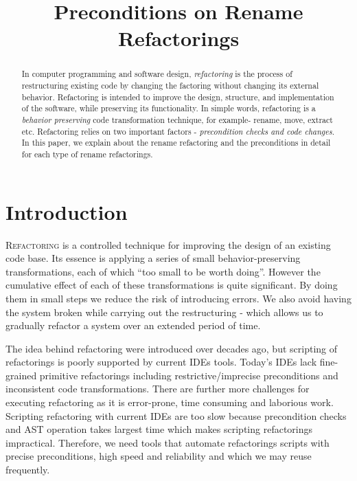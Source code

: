 \documentclass[10pt,conference]{IEEEtran}
\begin{document}
\title{Preconditions on Rename Refactorings}

\author{
\and
{}
\and
{}
}

\maketitle

\begin{abstract}
In computer programming and software design, \emph{refactoring} is the process of restructuring existing code by changing the factoring without changing its external behavior. Refactoring is intended to improve the design, structure, and implementation of the software, while preserving its functionality. In simple words, refactoring is a \emph{behavior preserving} code transformation technique, for example- rename, move, extract etc. Refactoring relies on two important factors - \emph{precondition checks and code changes}. In this paper, we explain about the rename refactoring and the preconditions in detail for each type of rename refactorings.
\end{abstract}

\section{\textbf{Introduction}}
\lettrine{R}{efactoring} is a controlled technique for improving the design of an existing code base. Its essence is applying a series of small behavior-preserving transformations, each of which ``too small to be worth doing''. However the cumulative effect of each of these transformations is quite significant. By doing them in small steps we reduce the risk of introducing errors. We also avoid having the system broken while carrying out the restructuring - which allows us to gradually refactor a system over an extended period of time.~\cite{Fowler}

The idea behind refactoring were introduced over decades ago, but scripting of refactorings is poorly supported by current IDEs tools. Today’s IDEs lack fine-grained primitive refactorings including restrictive/imprecise preconditions and inconsistent code transformations. There are further more challenges for executing refactoring as it is error-prone, time consuming and laborious work. Scripting refactoring with current IDEs are too slow because precondition checks and AST operation takes largest time which makes scripting refactorings impractical. Therefore, we need tools that automate refactorings scripts with precise preconditions, high speed and reliability and which we may reuse frequently. 
\end{document}
